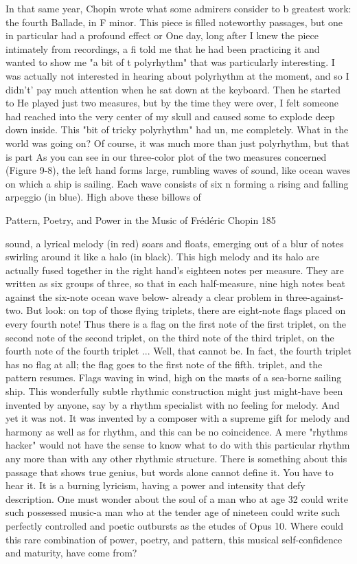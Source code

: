         In that same year, Chopin wrote what some admirers consider to b greatest work:
the fourth Ballade, in F minor. This piece is filled noteworthy passages, but one in
particular had a profound effect or One day, long after I knew the piece intimately from
recordings, a fi told me that he had been practicing it and wanted to show me "a bit of t
polyrhythm" that was particularly interesting. I was actually not interested in hearing
about polyrhythm at the moment, and so I didn’t' pay much attention when he sat down at
the keyboard. Then he started to He played just two measures, but by the time they were
over, I felt someone had reached into the very center of my skull and caused some to
explode deep down inside. This "bit of tricky polyrhythm" had un, me completely. What
in the world was going on?
        Of course, it was much more than just polyrhythm, but that is part As you can see
in our three-color plot of the two measures concerned (Figure 9-8), the left hand forms
large, rumbling waves of sound, like ocean waves on which a ship is sailing. Each wave
consists of six n forming a rising and falling arpeggio (in blue). High above these billows
of




Pattern, Poetry, and Power in the Music of Frédéric Chopin                              185

sound, a lyrical melody (in red) soars and floats, emerging out of a blur of notes swirling
around it like a halo (in black). This high melody and its halo are actually fused together
in the right hand's eighteen notes per measure. They are written as six groups of three, so
that in each half-measure, nine high notes beat against the six-note ocean wave below-
already a clear problem in three-against-two. But look: on top of those flying triplets,
there are eight-note flags placed on every fourth note! Thus there is a flag on the first
note of the first triplet, on the second note of the second triplet, on the third note of the
third triplet, on the fourth note of the fourth triplet ... Well, that cannot be. In fact, the
fourth triplet has no flag at all; the flag goes to the first note of the fifth. triplet, and the
pattern resumes. Flags waving in wind, high on the masts of a sea-borne sailing ship.
         This wonderfully subtle rhythmic construction might just might-have been
invented by anyone, say by a rhythm specialist with no feeling for melody. And yet it was
not. It was invented by a composer with a supreme gift for melody and harmony as well
as for rhythm, and this can be no coincidence. A mere "rhythms hacker" would not have
the sense to know what to do with this particular rhythm any more than with any other
rhythmic structure. There is something about this passage that shows true genius, but
words alone cannot define it. You have to hear it. It is a burning lyricism, having a power
and intensity that defy description.
         One must wonder about the soul of a man who at age 32 could write such
possessed music-a man who at the tender age of nineteen could write such perfectly
controlled and poetic outbursts as the etudes of Opus 10. Where could this rare
combination of power, poetry, and pattern, this musical self-confidence and maturity,
have come from?

